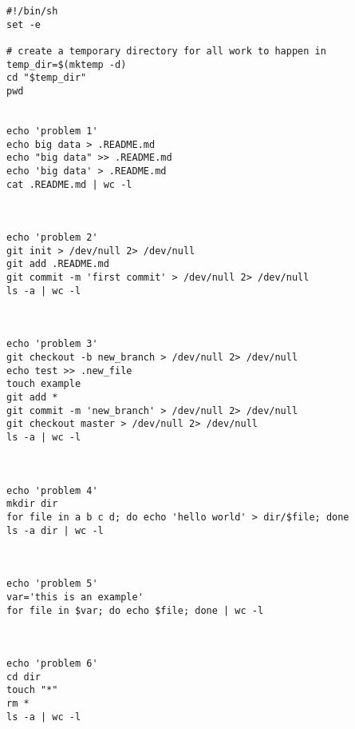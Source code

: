 \documentclass[10pt]{article}
\theoremstyle{definition}
\begin{document}
\newpage

\begin{lstlisting}
#!/bin/sh
set -e

# create a temporary directory for all work to happen in
temp_dir=$(mktemp -d)
cd "$temp_dir"
pwd


echo 'problem 1'
echo big data > .README.md
echo "big data" >> .README.md
echo 'big data' > .README.md
cat .README.md | wc -l



echo 'problem 2'
git init > /dev/null 2> /dev/null
git add .README.md
git commit -m 'first commit' > /dev/null 2> /dev/null
ls -a | wc -l



echo 'problem 3'
git checkout -b new_branch > /dev/null 2> /dev/null
echo test >> .new_file
touch example
git add *
git commit -m 'new_branch' > /dev/null 2> /dev/null
git checkout master > /dev/null 2> /dev/null
ls -a | wc -l



echo 'problem 4'
mkdir dir
for file in a b c d; do echo 'hello world' > dir/$file; done
ls -a dir | wc -l



echo 'problem 5'
var='this is an example'
for file in $var; do echo $file; done | wc -l



echo 'problem 6'
cd dir
touch "*"
rm *
ls -a | wc -l
\end{lstlisting}
\end{document}
